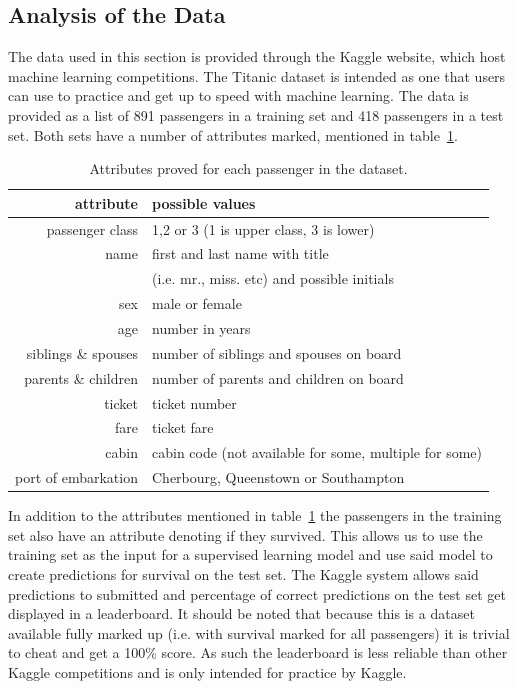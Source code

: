 \documentclass{llncs}
\begin{document}
\subsection{Analysis of the Data}
The data used in this section is provided through the Kaggle website, which host machine learning competitions. The Titanic dataset is intended as one that users can use to practice and get up to speed with machine learning. The data is provided as a list of 891 passengers in a training set and 418 passengers in a test set. Both sets have a number of attributes marked, mentioned in table~\ref{tab:passenger_attributes}.
\begin{table}[H]
\caption{Attributes proved for each passenger in the dataset.}
\label{tab:passenger_attributes}
\centering
\begin{tabular}{ r | l }
  attribute & possible values \\ \hline \hline
  passenger class & 1,2 or 3 (1 is upper class, 3 is lower)  \\
  name & first and last name with title \\
  & (i.e. mr., miss. etc) and possible initials  \\
  sex & male or female \\
  age & number in years \\
  siblings \& spouses & number of siblings and spouses on board \\
  parents \& children & number of parents and children on board \\
  ticket & ticket number \\
  fare & ticket fare \\
  cabin & cabin code (not available for some, multiple for some)\\
  port of embarkation & Cherbourg, Queenstown or Southampton

\end{tabular}
\end{table}
In addition to the attributes mentioned in table~\ref{tab:passenger_attributes} the passengers in the training set also have an attribute denoting if they survived. This allows us to use the training set as the input for a supervised learning model and use said model to create predictions for survival on the test set. The Kaggle system allows said predictions to submitted and percentage of correct predictions on the test set get displayed in a leaderboard. It should be noted that because this is a dataset available fully marked up (i.e. with survival marked for all passengers) it is trivial to cheat and get a 100\% score. As such the leaderboard is less reliable than other Kaggle competitions and is only intended for practice by Kaggle. 
\end{document}
